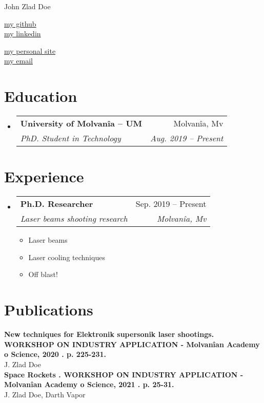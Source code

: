 \documentclass[letterpaper,10pt]{article}
\makeatletter
\newcommand{\resumeItem}[1]{
  \item\small{
    {#1 \vspace{-2pt}}
  }
}
\newcommand{\resumeSubheading}[4]{
  \vspace{-2pt}\item
    \begin{tabular*}{0.97\textwidth}[t]{l@{\extracolsep{\fill}}r}
      \textbf{#1} & #2 \\
      \textit{\small#3} & \textit{\small #4} \\
    \end{tabular*}\vspace{-7pt}
}
\newcommand{\resumeSubHeadingListStart}{\begin{itemize}[leftmargin=0.15in, label={}]}
\newcommand{\resumeSubHeadingListEnd}{\end{itemize}}
\newcommand{\resumeItemListStart}{\begin{itemize}}
\newcommand{\resumeItemListEnd}{\end{itemize}\vspace{-5pt}}
\makeatother
\begin{document}
\begin{center}
    {\LARGE John Zlad Doe} \\ \vspace{2pt}
    \begin{multicols}{2}
    \begin{flushleft}
    \href{{your github page link}}{my github}\\
    \href{{your linkedin page link}}{my linkedin}
    \end{flushleft}
    
    \begin{flushright}
    \href{{your personal websit link}}{my personal site}\\
    \href{mailto:{your email adress}}{my email}
    \end{flushright}
    \end{multicols}
\end{center}


\vspace{-2pt}
\section{Education}
  \resumeSubHeadingListStart
      \resumeSubheading
      {University of Molvanîa -- UM}{Molvanîa, Mv}
      {PhD. Student in Technology}{Aug. 2019 -- Present}

  \resumeSubHeadingListEnd


\section{Experience}
  \resumeSubHeadingListStart
    \resumeSubheading
      {Ph.D. Researcher}{Sep. 2019 -- Present}
      {Laser beams shooting research}{Molvanîa, Mv}
      \resumeItemListStart
        \resumeItem{Laser beams}
        \resumeItem{Laser cooling techniques}
        \resumeItem{Off blast!}
    \resumeItemListEnd

  \resumeSubHeadingListEnd

\section{Publications}
 \begin{itemize}[leftmargin=0.15in, label={}]
    \small{\item{
    \textbf{New techniques for Elektronik supersonik laser shootings. WORKSHOP ON INDUSTRY APPLICATION - Molvanîan Academy o Science, 2020 . p. 225-231.}{\\J. Zlad Doe}\\
        \textbf{Space Rockets . WORKSHOP ON INDUSTRY APPLICATION - Molvanîan Academy o Science, 2021 . p. 25-31.}{\\J. Zlad Doe, Darth Vapor}\\
\ 
}}
 \end{itemize}
\end{document}
